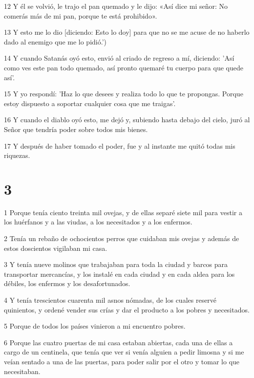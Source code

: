 \par 12 Y él se volvió, le trajo el pan quemado y le dijo: «Así dice mi señor: No comerás más de mi pan, porque te está prohibido».

\par 13 Y esto me lo dio [diciendo: Esto lo doy] para que no se me acuse de no haberlo dado al enemigo que me lo pidió.')

\par 14 Y cuando Satanás oyó esto, envió al criado de regreso a mí, diciendo: 'Así como ves este pan todo quemado, así pronto quemaré tu cuerpo para que quede así'.

\par 15 Y yo respondí: 'Haz lo que desees y realiza todo lo que te propongas. Porque estoy dispuesto a soportar cualquier cosa que me traigas'.

\par 16 Y cuando el diablo oyó esto, me dejó y, subiendo hasta debajo del cielo, juró al Señor que tendría poder sobre todos mis bienes.

\par 17 Y después de haber tomado el poder, fue y al instante me quitó todas mis riquezas.

\chapter{3}

\par 1 Porque tenía ciento treinta mil ovejas, y de ellas separé siete mil para vestir a los huérfanos y a las viudas, a los necesitados y a los enfermos.

\par 2 Tenía un rebaño de ochocientos perros que cuidaban mis ovejas y además de estos doscientos vigilaban mi casa.

\par 3 Y tenía nueve molinos que trabajaban para toda la ciudad y barcos para transportar mercancías, y los instalé en cada ciudad y en cada aldea para los débiles, los enfermos y los desafortunados.

\par 4 Y tenía trescientos cuarenta mil asnos nómadas, de los cuales reservé quinientos, y ordené vender sus crías y dar el producto a los pobres y necesitados.

\par 5 Porque de todos los países vinieron a mi encuentro pobres.

\par 6 Porque las cuatro puertas de mi casa estaban abiertas, cada una de ellas a cargo de un centinela, que tenía que ver si venía alguien a pedir limosna y si me veían sentado a una de las puertas, para poder salir por el otro y tomar lo que necesitaban.

